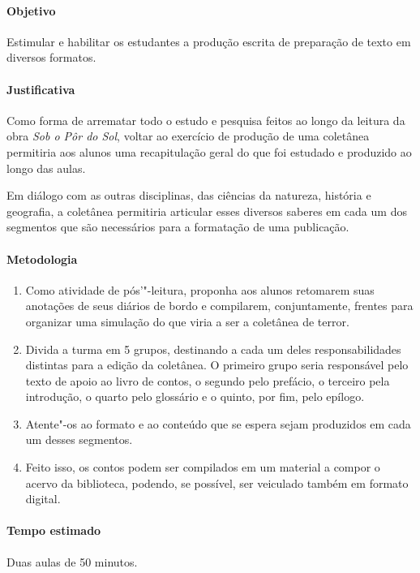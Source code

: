 \documentclass[12pt]{extarticle}
\begin{document}
\paragraph{Objetivo} Estimular e habilitar os estudantes a produção escrita de preparação de 
texto em diversos formatos. 

\paragraph{Justificativa} Como forma de arrematar todo o estudo e pesquisa feitos ao longo da 
leitura da obra \emph{Sob o Pôr do Sol}, voltar ao exercício de produção de uma coletânea permitiria 
aos alunos uma recapitulação geral do que foi estudado e produzido ao longo das aulas. 

Em diálogo com as outras disciplinas, das ciências da natureza, história e geografia, a coletânea permitiria
articular esses diversos saberes em cada um dos segmentos que são necessários para a formatação de uma 
publicação. 

\paragraph{Metodologia}

\begin{enumerate}
\item
Como atividade de pós'"-leitura, proponha aos alunos retomarem suas anotações de seus diários 
de bordo e compilarem, conjuntamente, frentes para organizar uma simulação do que viria a ser 
a coletânea de terror. 

\item
Divida a turma em 5 grupos, destinando a cada um deles responsabilidades distintas para a edição da 
coletânea. O primeiro grupo seria responsável pelo texto de apoio ao livro de contos, o segundo pelo 
prefácio, o terceiro pela introdução, o quarto pelo glossário e o quinto, por fim, pelo epílogo. 

\item
Atente"-os ao formato e ao conteúdo que se espera sejam
produzidos em cada um desses segmentos. 

\item
Feito isso, os contos podem ser compilados em um material a compor o acervo da biblioteca, podendo, se 
possível, ser veiculado também em formato digital. 

\end{enumerate}

\paragraph{Tempo estimado} Duas aulas de 50 minutos.
\end{document}
